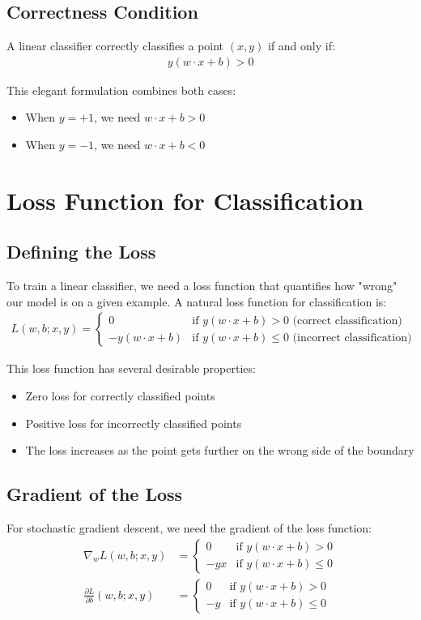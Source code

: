 \documentclass{article}
\begin{document}
\subsection{Correctness Condition}
A linear classifier correctly classifies a point $(x, y)$ if and only if:
\begin{align}
y(w \cdot x + b) > 0
\end{align}

This elegant formulation combines both cases:
\begin{itemize}
    \item When $y = +1$, we need $w \cdot x + b > 0$
    \item When $y = -1$, we need $w \cdot x + b < 0$
\end{itemize}

\section{Loss Function for Classification}

\subsection{Defining the Loss}
To train a linear classifier, we need a loss function that quantifies how "wrong" our model is on a given example. A natural loss function for classification is:
\begin{align}
L(w, b; x, y) = 
\begin{cases}
0 & \text{if } y(w \cdot x + b) > 0 \text{ (correct classification)} \\
-y(w \cdot x + b) & \text{if } y(w \cdot x + b) \leq 0 \text{ (incorrect classification)}
\end{cases}
\end{align}

This loss function has several desirable properties:
\begin{itemize}
    \item Zero loss for correctly classified points
    \item Positive loss for incorrectly classified points
    \item The loss increases as the point gets further on the wrong side of the boundary
\end{itemize}

\subsection{Gradient of the Loss}
For stochastic gradient descent, we need the gradient of the loss function:
\begin{align}
\nabla_w L(w, b; x, y) &= 
\begin{cases}
0 & \text{if } y(w \cdot x + b) > 0 \\
-yx & \text{if } y(w \cdot x + b) \leq 0
\end{cases} \\
\frac{\partial L}{\partial b}(w, b; x, y) &= 
\begin{cases}
0 & \text{if } y(w \cdot x + b) > 0 \\
-y & \text{if } y(w \cdot x + b) \leq 0
\end{cases}
\end{align}
\end{document}
